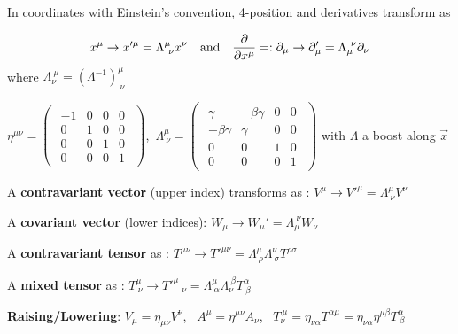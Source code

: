 \item In coordinates with Einstein's convention, 4-position and derivatives transform as

$$x^\mu \rightarrow x'^{\mu} = \Lambda^{\mu}_{\ \nu} x^{\nu} \quad \text{and} \quad 
 \pad{}{x^\mu}=: \partial_\mu \rightarrow \partial_\mu' = \Lambda_\mu^{\ \nu}\partial_\nu
$$
where $\Lambda_\nu^{\ \mu}= (\Lambda^{-1})^\mu_{\ \nu} $

\item $\eta^{\mu\nu}=
\begin{pmatrix}
\begin{array}{cccc}
-1 & 0 & 0 & 0 \\ 
0 & 1 & 0 & 0 \\ 
0 & 0 & 1 & 0 \\ 
0 & 0 & 0 & 1
\end{array} 
\end{pmatrix}$,\, $
\Lambda^\mu_{\ \nu}=
\begin{pmatrix}
\begin{array}{cccc}
\gamma & -\beta \gamma & 0 & 0 \\ 
-\beta \gamma & \gamma & 0 & 0 \\ 
0 & 0 & 1 & 0 \\ 
0 & 0 & 0 & 1
\end{array} 
\end{pmatrix}$
with $\Lambda$ a boost along $\vec{x}$


\squishend
\vspace{2cm}
\squishlist

\item A \textbf{contravariant vector} (upper index) transforms as : $V^\mu\rightarrow V'^{\mu} = \Lambda^{\mu}_{\ \nu} V^{\nu}$

\item A \textbf{covariant vector} (lower indices): $W_{\mu} \rightarrow W_{\mu}' = \Lambda_{\mu}^{\ \nu}W_\nu $

\item A \textbf{contravariant tensor} as : $T^{\mu \nu} \rightarrow T'^{\mu \nu} = \Lambda^{\mu}_{\ \rho} \Lambda^{\nu}_{\ \sigma} T^{\rho \sigma}$

\item A \textbf{mixed tensor} as : $T^\mu_{\ \nu} \rightarrow T'^\mu_{\quad \nu} = \Lambda^\mu_{\ \alpha}\Lambda_\nu^{\ \beta}T_{\ \beta}^\alpha $ 

\item \textbf{Raising/Lowering}: $V_\mu=\eta_{\mu\nu}V^\nu$, \ $A^{\mu} = \eta^{\mu\nu} A_{\nu}$, \ $T^{\ \mu}_\nu = \eta_{\nu\alpha}T^{\alpha\mu}=\eta_{\nu\alpha}\eta^{\mu\beta} T^\alpha_{\ \beta}$

